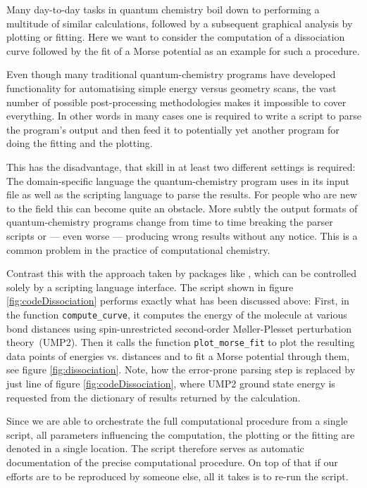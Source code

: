 Many day-to-day tasks in quantum chemistry boil down to
performing a multitude of similar calculations,
followed by a subsequent graphical analysis
by plotting or fitting.
Here we want to consider the computation of a dissociation curve
followed by the fit of a Morse potential
as an example for such a procedure.

Even though many traditional quantum-chemistry programs
have developed functionality for automatising simple
energy versus geometry scans,
the vast number of possible post-processing methodologies
makes it impossible to cover everything.
In other words in many cases one is required to write a script
to parse the program's output and then feed it to potentially yet
another program for doing the fitting and the plotting.

This has the disadvantage,
that skill in at least two different settings is required:
The domain-specific language the quantum-chemistry program uses
in its input file as well as the scripting language to parse the results.
For people who are new to the field this can become quite an obstacle.
More subtly the output formats
of quantum-chemistry programs change from time to time
breaking the parser scripts or --- even worse ---
producing wrong results without any notice.
This is a common problem in the practice of computational chemistry.

Contrast this with the approach taken by packages like \molsturm,
which can be controlled solely by a scripting language interface.
The \python script shown in figure \ref{fig:codeDissociation} performs
exactly what has been discussed above:
First, in the function \texttt{compute\_curve},
it computes the energy of the  molecule
at various bond distances using spin-unrestricted
second-order Møller-Plesset perturbation theory~(UMP2).
Then it calls the function \texttt{plot\_morse\_fit}
to plot the resulting data points of energies vs. distances
and to fit a Morse potential through them,
see figure \ref{fig:dissociation}.
Note, how the error-prone parsing step is replaced by just
line \lextract of figure \ref{fig:codeDissociation},
where UMP2 ground state energy is requested from the
dictionary of results returned by the calculation.

Since we are able to orchestrate the full computational procedure
from a single script,
all parameters influencing the computation, the plotting or the fitting
are denoted in a single location.
The script therefore serves as automatic documentation
of the precise computational procedure.
On top of that if our efforts are to be reproduced by someone else,
all it takes is to re-run the script.

